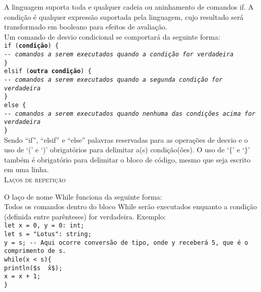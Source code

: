 \documentclass[12pt,a4paper]{article}
\def\emph#1{\textbf{#1}} %
\begin{document}
A linguagem suporta toda e qualquer cadeia ou aninhamento de comandos if. A condição é qualquer expressão suportada pela linguagem, cujo resultado será transformado em booleano para efeitos de avaliação.\\

Um comando de desvio condicional se comportará da seguinte forma: \\

\noindent\texttt{if (\emph{condição}) \{\\
\indent\textit{-{}- comandos a serem executados quando a condição for verdadeira} \\
\} \\
elsif (\emph{outra condição}) \{\\
\indent\textit{-{}- comandos a serem executados quando a segunda condição for verdadeira} \\
\} \\
else \{\\
\indent\textit{-{}- comandos a serem executados quando nenhuma das condições acima for verdadeira} \\
\}}\\

Sendo ``if'', ``elsif'' e ``else'' palavras reservadas para as operações de desvio e o uso de `(' e `)' obrigatórios para delimitar a(s) condição(ões). O uso de `$\{$' e `$\}$' também é obrigatório para delimitar o bloco de código, mesmo que seja escrito em uma linha.\\


\hypertarget{label5}{\Large{\textsc{Laços de repetição}}}\\[0.3cm]
\normalsize

O laço de nome While funciona da seguinte forma: \\

Todos os comandos dentro do bloco While serão executados enquanto a condição (definida entre parênteses) for verdadeira. Exemplo: \\[0.25cm]
\texttt{\noindent let x = 0, y = 0: int;\\
\noindent let s = "Lotus": string;\\
\noindent y = s; -{}- Aqui ocorre conversão de tipo, onde y receberá 5, que é o comprimento de s. \\[0.2cm]
\noindent while(x < s)\{\\
\indent println(\$s \^\ x\$);\\
\indent x = x + 1;\\
\}}\\
\end{document}
